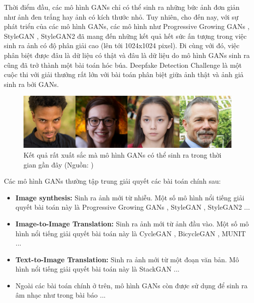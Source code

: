 {    \noindent Thời điểm đầu, các mô hình GANs chỉ có thể sinh ra những bức ảnh đơn giản như ảnh đen trắng hay ảnh có kích thước nhỏ. Tuy nhiên, cho đến nay, với sự phát triển của các mô hình GANs, các mô hình như Progressive Growing GANs \cite{progressive-growing-gans}, StyleGAN \cite{style-gan}, StyleGAN2 \cite{style-gan2} đã mang đến những kết quả hết sức ấn tượng trong việc sinh ra ảnh có độ phân giải cao (lên tới 1024x1024 pixel). Đi cùng với đó, việc phân biệt được đâu là dữ liệu có thật và đâu là dữ liệu do mô hình GANs sinh ra cũng đã trở thành một bài toán hóc búa. Deepfake Detection Challenge là một cuộc thi với giải thưởng rất lớn với bài toán phân biệt giữa ảnh thật và ảnh giả sinh ra bởi GANs.
    
    \begin{figure}[H]
    \centering
    \includegraphics[width=12cm] {images/result_stylegan2.png}
    \caption{Kết quả rất xuất sắc mà mô hình GANs có thể sinh ra trong thời gian gần đây (Nguồn: \cite{style-gan2})}
    \label{fig:result_stylegan2}
    \end{figure}
    
    \noindent Các mô hình GANs thường tập trung giải quyết các bài toán chính sau:
    \begin{itemize}[leftmargin=0cm,itemindent=.5cm,labelwidth=\itemindent,labelsep=0cm,align=left]
      \item \textbf{Image synthesis:} Sinh ra ảnh mới từ nhiễu. Một số mô hình nổi tiếng giải quyết bài toán này là Progressive Growing GANs \cite{progressive-growing-gans}, StyleGAN \cite{style-gan}, StyleGAN2 \cite{style-gan2} ...
      \item \textbf{Image-to-Image Translation:} Sinh ra ảnh mới từ ảnh đầu vào. Một số mô hình nổi tiếng giải quyết bài toán này là CycleGAN \cite{cycle-gan}, BicycleGAN \cite{bicyle-gan}, MUNIT \cite{munit} ...
      \item \textbf{Text-to-Image Translation:} Sinh ra ảnh mới từ một đoạn văn bản. Mô hình nổi tiếng giải quyết bài toán này là StackGAN \cite{stack-gan} ...
      \item Ngoài các bài toán chính ở trên, mô hình GANs còn được sử dụng để sinh ra âm nhạc như trong bài báo \cite{midinet} ...
    \end{itemize}

}
